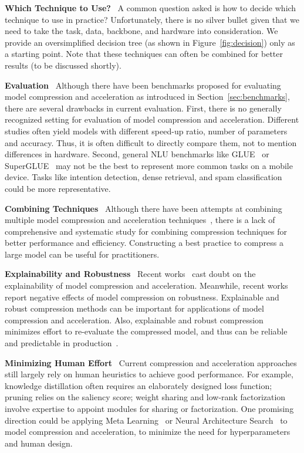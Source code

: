 \documentclass[letterpaper]{article}
\newcommand{\paratitle}[1]{\noindent\textbf{#1}\ }
\begin{document}
\paratitle{Which Technique to Use?} A common question asked is how to decide which technique to use in practice? Unfortunately, there is no silver bullet given  that we need to take the task, data, backbone,
and
hardware
into consideration. We provide an oversimplified decision tree (as shown in Figure~\ref{fig:decision}) only as a starting point.
Note that these techniques can often be combined for better results (to be discussed shortly).

\paratitle{Evaluation} Although there have been benchmarks proposed for evaluating model compression and acceleration as introduced in Section~\ref{sec:benchmarks}, there are several drawbacks in current evaluation. First, there is no generally recognized setting for evaluation of model compression and acceleration. Different studies often yield models with different speed-up ratio, number of parameters and accuracy. Thus, it is often difficult to directly compare them, not to mention differences in hardware. Second, general NLU benchmarks like GLUE~\citep{glue} or SuperGLUE~\citep{superglue} may not be the best to represent more common tasks on a mobile device. Tasks like intention detection, dense retrieval, and spam classification could be more representative.

\paratitle{Combining Techniques} Although there have been attempts at combining multiple model compression and acceleration techniques~\citep{kim2020fastformers,sanh2020movement,xu2021beyond}, there is a lack of comprehensive and systematic study for combining compression techniques for better performance and efficiency. Constructing a best practice to compress a large model can be useful for practitioners.

\paratitle{Explainability and Robustness} Recent works~\citep{stanton2021does,xu2021beyond} cast doubt on the explainability of model compression and acceleration. Meanwhile, recent works~\citep{du2021compressed,xu2021beyond} report negative effects of model compression on robustness. Explainable and robust compression methods can be important for applications of model compression and acceleration. Also, explainable and robust compression minimizes effort to re-evaluate the compressed model, and thus can be reliable and predictable in production~\citep{stanton2021does,xu2021beyond}.

\paratitle{Minimizing Human Effort} Current compression and acceleration approaches still largely rely on human heuristics to achieve good performance. For example, knowledge distillation often requires an elaborately designed loss function; pruning relies on the saliency score; weight sharing and low-rank factorization involve expertise to appoint modules for sharing or factorization. One promising direction could be applying Meta Learning~\citep{maml} or Neural Architecture Search~\citep{darts} to model compression and acceleration, to minimize the need for hyperparameters and human design.
\end{document}
